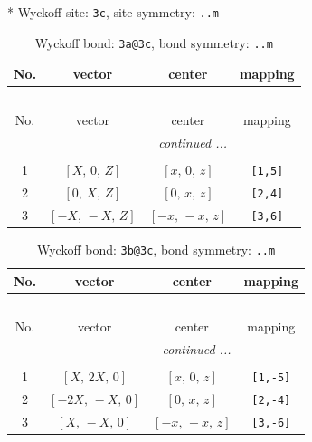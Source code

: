 \documentclass[fleqn,8pt]{jsarticle}
\begin{document}
* Wyckoff site: {\tt 3c}, site symmetry: {\tt ..m}
\renewcommand{\arraystretch}{1.2}
\begin{longtable}{cccc}
\caption{Wyckoff bond: {\tt 3a@3c}, bond symmetry: {\tt ..m}}
 \\
 \hline \hline
No. & vector & center & mapping \\ \hline \endfirsthead

\multicolumn{3}{l}{\tablename\ \thetable{}} \\
 \hline \hline
No. & vector & center & mapping \\ \hline \endhead

 \hline \hline
\multicolumn{3}{r}{\footnotesize\it continued ...} \\ \endfoot

 \hline \hline
\multicolumn{3}{r}{} \\ \endlastfoot

1 & $\left[ X,\, 0,\, Z \right]$ & $\left[ x,\, 0,\, z \right]$ & {\tt [1,5]} \\ \hline
2 & $\left[ 0,\, X,\, Z \right]$ & $\left[ 0,\, x,\, z \right]$ & {\tt [2,4]} \\ \hline
3 & $\left[ - X,\, - X,\, Z \right]$ & $\left[ - x,\, - x,\, z \right]$ & {\tt [3,6]} \\
\end{longtable}
\renewcommand{\arraystretch}{1.2}
\begin{longtable}{cccc}
\caption{Wyckoff bond: {\tt 3b@3c}, bond symmetry: {\tt ..m}}
 \\
 \hline \hline
No. & vector & center & mapping \\ \hline \endfirsthead

\multicolumn{3}{l}{\tablename\ \thetable{}} \\
 \hline \hline
No. & vector & center & mapping \\ \hline \endhead

 \hline \hline
\multicolumn{3}{r}{\footnotesize\it continued ...} \\ \endfoot

 \hline \hline
\multicolumn{3}{r}{} \\ \endlastfoot

1 & $\left[ X,\, 2 X,\, 0 \right]$ & $\left[ x,\, 0,\, z \right]$ & {\tt [1,-5]} \\ \hline
2 & $\left[ - 2 X,\, - X,\, 0 \right]$ & $\left[ 0,\, x,\, z \right]$ & {\tt [2,-4]} \\ \hline
3 & $\left[ X,\, - X,\, 0 \right]$ & $\left[ - x,\, - x,\, z \right]$ & {\tt [3,-6]} \\
\end{longtable}
\end{document}
